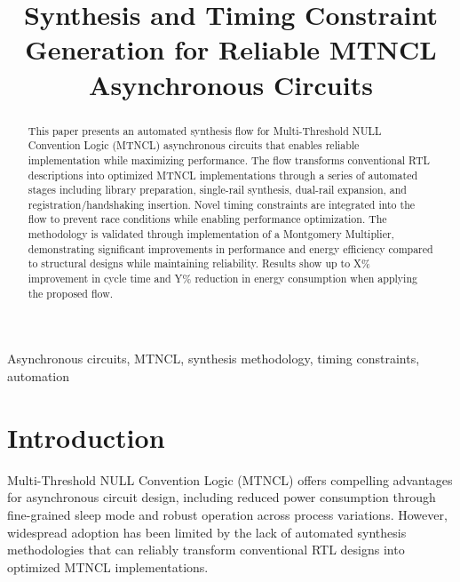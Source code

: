 \documentclass[conference]{IEEEtran}
\begin{document}
\title{Synthesis and Timing Constraint Generation for Reliable MTNCL Asynchronous Circuits}

\author{
}

\maketitle

\begin{abstract}
This paper presents an automated synthesis flow for Multi-Threshold NULL Convention Logic (MTNCL) asynchronous circuits that enables reliable implementation while maximizing performance. The flow transforms conventional RTL descriptions into optimized MTNCL implementations through a series of automated stages including library preparation, single-rail synthesis, dual-rail expansion, and registration/handshaking insertion. Novel timing constraints are integrated into the flow to prevent race conditions while enabling performance optimization. The methodology is validated through implementation of a Montgomery Multiplier, demonstrating significant improvements in performance and energy efficiency compared to structural designs while maintaining reliability. Results show up to X\% improvement in cycle time and Y\% reduction in energy consumption when applying the proposed flow.
\end{abstract}

\begin{IEEEkeywords}
Asynchronous circuits, MTNCL, synthesis methodology, timing constraints, automation
\end{IEEEkeywords}

\section{Introduction}
Multi-Threshold NULL Convention Logic (MTNCL) offers compelling advantages for asynchronous circuit design, including reduced power consumption through fine-grained sleep mode and robust operation across process variations. However, widespread adoption has been limited by the lack of automated synthesis methodologies that can reliably transform conventional RTL designs into optimized MTNCL implementations.
\end{document}
